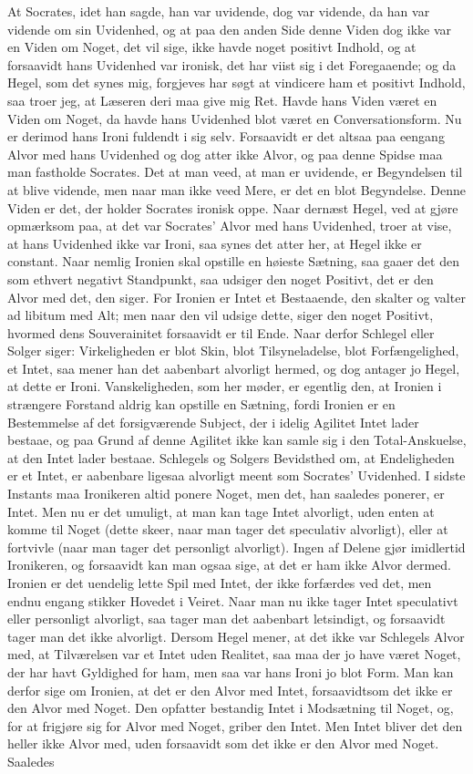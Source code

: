 \documentclass[12pt,a4paper]{article}
\begin{document}
At Socrates, idet han sagde, han var uvidende, dog var vidende, da han var vidende om sin Uvidenhed, og at paa den anden Side denne Viden dog ikke var en Viden om Noget, det vil sige, ikke havde noget positivt Indhold, og at forsaavidt hans Uvidenhed var ironisk, det har viist sig i det Foregaaende; og da Hegel, som det synes mig, forgjeves har søgt at vindicere ham et positivt Indhold, saa troer jeg, at Læseren deri maa give mig Ret. Havde hans Viden været en Viden om Noget, da havde hans Uvidenhed blot været en Conversationsform. Nu er derimod hans Ironi fuldendt i sig selv. Forsaavidt er det altsaa paa eengang Alvor med hans Uvidenhed og dog atter ikke Alvor, og paa denne Spidse maa man fastholde Socrates. Det at man veed, at man er uvidende, er Begyndelsen til at blive vidende, men naar man ikke veed Mere, er det en blot Begyndelse. Denne Viden er det, der holder Socrates ironisk oppe. Naar dernæst Hegel, ved at gjøre opmærksom paa, at det var Socrates' Alvor med hans Uvidenhed, troer at vise, at hans Uvidenhed ikke var Ironi, saa synes det atter her, at Hegel ikke er constant. Naar nemlig Ironien skal opstille en høieste Sætning, saa gaaer det den som ethvert negativt Standpunkt, saa udsiger den noget Positivt, det er den Alvor med det, den siger. For Ironien er Intet et Bestaaende, den skalter og valter ad libitum med Alt; men naar den vil udsige dette, siger den noget Positivt, hvormed dens Souverainitet forsaavidt er til Ende. Naar derfor Schlegel eller Solger siger: Virkeligheden er blot Skin, blot Tilsyneladelse, blot Forfængelighed, et Intet, saa mener han det aabenbart alvorligt hermed, og dog antager jo Hegel, at dette er Ironi. Vanskeligheden, som her møder, er egentlig den, at Ironien i strængere Forstand aldrig kan opstille en Sætning, fordi Ironien er en Bestemmelse af det forsigværende Subject, der i idelig Agilitet Intet lader bestaae, og paa Grund af denne Agilitet ikke kan samle sig i den Total-Anskuelse, at den Intet lader bestaae. Schlegels og Solgers Bevidsthed om, at Endeligheden er et Intet, er aabenbare ligesaa alvorligt meent som Socrates' Uvidenhed. I sidste Instants maa Ironikeren altid ponere Noget, men det, han saaledes ponerer, er Intet. Men nu er det umuligt, at man kan tage Intet alvorligt, uden enten at komme til Noget (dette skeer, naar man tager det speculativ alvorligt), eller at fortvivle (naar man tager det personligt alvorligt). Ingen af Delene gjør imidlertid Ironikeren, og forsaavidt kan man ogsaa sige, at det er ham ikke Alvor dermed. Ironien er det uendelig lette Spil med Intet, der ikke forfærdes ved det, men endnu engang stikker Hovedet i Veiret. Naar man nu ikke tager Intet speculativt eller personligt alvorligt, saa tager man det aabenbart letsindigt, og forsaavidt tager man det ikke alvorligt. Dersom Hegel mener, at det ikke var Schlegels Alvor med, at Tilværelsen var et Intet uden Realitet, saa maa der jo have været Noget, der har havt Gyldighed for ham, men saa var hans Ironi jo blot Form. Man kan derfor sige om Ironien, at det er den Alvor med Intet, forsaavidtsom det ikke er den Alvor med Noget. Den opfatter bestandig Intet i Modsætning til Noget, og, for at frigjøre sig for Alvor med Noget, griber den Intet. Men Intet bliver det den heller ikke Alvor med, uden forsaavidt som det ikke er den Alvor med Noget. Saaledes 
\end{document}

